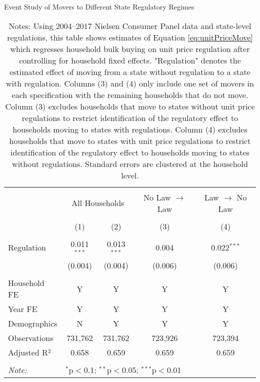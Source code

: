 \begin{table}[!htbp] \centering
  \caption{Event Study of Movers to Different State Regulatory Regimes}
  \label{tab:unitPriceLawMovers}
\begin{tabular}{@{\extracolsep{5pt}}lcccc}
\\[-1.8ex]\hline
\hline \\[-1.8ex]
 & \multicolumn{2}{c}{All Households} & No Law $\rightarrow$ Law & Law $\rightarrow$ No Law \\
\\[-1.8ex] & (1) & (2) & (3) & (4)\\
\hline \\[-1.8ex]
 Regulation & 0.011$^{***}$ & 0.013$^{***}$ & 0.004 & 0.022$^{***}$ \\
  & (0.004) & (0.004) & (0.006) & (0.006) \\
 \hline \\[-1.8ex]
Household FE & Y & Y & Y & Y \\
Year FE & Y & Y & Y & Y \\
Demographics & N & Y & Y & Y \\
Observations & 731,762 & 731,762 & 723,926 & 723,394 \\
Adjusted R$^{2}$ & 0.658 & 0.659 & 0.659 & 0.659 \\
\hline
\hline \\[-1.8ex]
\textit{Note:}  & \multicolumn{4}{l}{$^{*}$p$<$0.1; $^{**}$p$<$0.05; $^{***}$p$<$0.01} \\
\end{tabular}
\caption*{Notes: Using 2004--2017 Nielsen Consumer Panel data and state-level regulations, this table shows estimates of Equation \ref{eq:unitPriceMove} which regresses household bulk buying on unit price regulation after controlling for household fixed effects. "Regulation" denotes the estimated effect of moving from a state without regulation to a state with regulation. Columns (3) and (4) only include one set of movers in each specification with the remaining households that do not move. Column (3) excludes households that move to states without unit price regulations to restrict identification of the regulatory effect to households moving to states with regulations. Column (4) excludes households that move to states with unit price regulations to restrict identification of the regulatory effect to households moving to states without regulations. Standard errors are clustered at the household level.}
\end{table}
